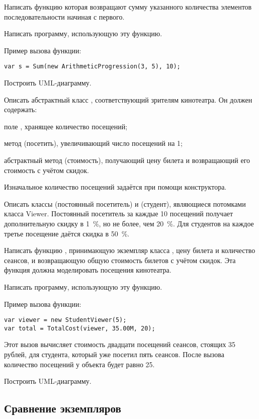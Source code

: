 Написать функцию  которая возвращают сумму указанного
количества элементов последовательности начиная с первого.

Написать программу, использующую эту функцию.

Пример вызова функции:
\begin{lstlisting}[numbers=none]
var s = Sum(new ArithmeticProgression(3, 5), 10);
\end{lstlisting}

Построить UML-диаграмму.

\task Описать абстрактный класс , соответствующий зрителям
кинотеатра. Он должен содержать:
\begin{itemize*}
\item поле , хранящее количество посещений;
\item метод  (посетить), увеличивающий число посещений на
  1;
\item абстрактный метод  (стоимость), получающий цену билета
  и возвращающий его стоимость с учётом скидок.
\end{itemize*}
Изначальное количество посещений задаётся при помощи конструктора.

Описать классы  (постоянный посетитель) и
 (студент), являющиеся потомками класса
Viewer. Постоянный посетитель за каждые 10 посещений получает
дополнительную скидку в 1~\%, но не более, чем 20~\%. Для студентов на
каждое третье посещение даётся скидка в 50~\%.

Написать функцию , принимающую экземпляр класса
, цену билета и количество сеансов, и возвращающую общую
стоимость билетов с учётом скидок. Эта функция должна моделировать
посещения кинотеатра.

Написать программу, использующую эту функцию.

Пример вызова функции:
\begin{lstlisting}[numbers=none]
var viewer = new StudentViewer(5);
var total = TotalCost(viewer, 35.00M, 20);
\end{lstlisting}
Этот вызов вычисляет стоимость двадцати посещений сеансов, стоящих 35
рублей, для студента, который уже посетил пять сеансов. После вызова
количество посещений у объекта  будет равно 25.

Построить UML-диаграмму.


\subsection{Сравнение экземпляров}

